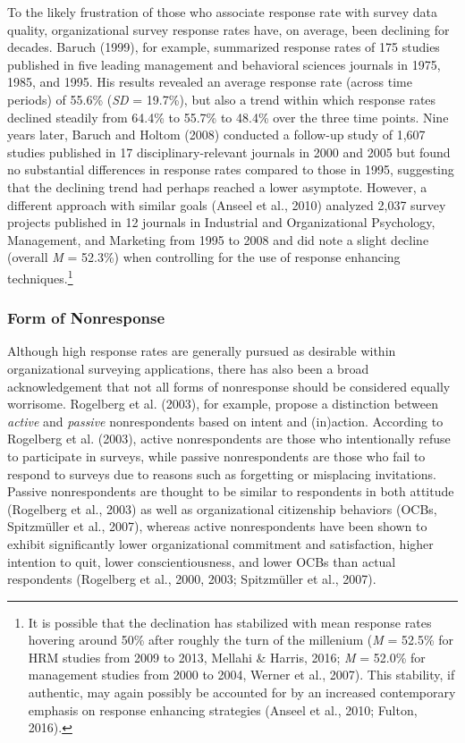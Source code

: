 \documentclass[
  man,mask]{apa7}
\begin{document}
To the likely frustration of those who associate response rate with survey data quality, organizational survey response rates have, on average, been declining for decades. Baruch (1999), for example, summarized response rates of 175 studies published in five leading management and behavioral sciences journals in 1975, 1985, and 1995. His results revealed an average response rate (across time periods) of 55.6\% (\emph{SD} = 19.7\%), but also a trend within which response rates declined steadily from 64.4\% to 55.7\% to 48.4\% over the three time points. Nine years later, Baruch and Holtom (2008) conducted a follow-up study of 1,607 studies published in 17 disciplinary-relevant journals in 2000 and 2005 but found no substantial differences in response rates compared to those in 1995, suggesting that the declining trend had perhaps reached a lower asymptote. However, a different approach with similar goals (Anseel et al., 2010) analyzed 2,037 survey projects published in 12 journals in Industrial and Organizational Psychology, Management, and Marketing from 1995 to 2008 and did note a slight decline (overall \emph{M} = 52.3\%) when controlling for the use of response enhancing techniques.\footnote{It is possible that the declination has stabilized with mean response rates hovering around 50\% after roughly the turn of the millenium (\emph{M} = 52.5\% for HRM studies from 2009 to 2013, Mellahi \& Harris, 2016; \emph{M} = 52.0\% for management studies from 2000 to 2004, Werner et al., 2007). This stability, if authentic, may again possibly be accounted for by an increased contemporary emphasis on response enhancing strategies (Anseel et al., 2010; Fulton, 2016).}

\hypertarget{form-of-nonresponse}{%
\subsubsection{Form of Nonresponse}\label{form-of-nonresponse}}

Although high response rates are generally pursued as desirable within organizational surveying applications, there has also been a broad acknowledgement that not all forms of nonresponse should be considered equally worrisome. Rogelberg et al. (2003), for example, propose a distinction between \emph{active} and \emph{passive} nonrespondents based on intent and (in)action. According to Rogelberg et al. (2003), active nonrespondents are those who intentionally refuse to participate in surveys, while passive nonrespondents are those who fail to respond to surveys due to reasons such as forgetting or misplacing invitations. Passive nonrespondents are thought to be similar to respondents in both attitude (Rogelberg et al., 2003) as well as organizational citizenship behaviors (OCBs, Spitzmüller et al., 2007), whereas active nonrespondents have been shown to exhibit significantly lower organizational commitment and satisfaction, higher intention to quit, lower conscientiousness, and lower OCBs than actual respondents (Rogelberg et al., 2000, 2003; Spitzmüller et al., 2007).
\end{document}
